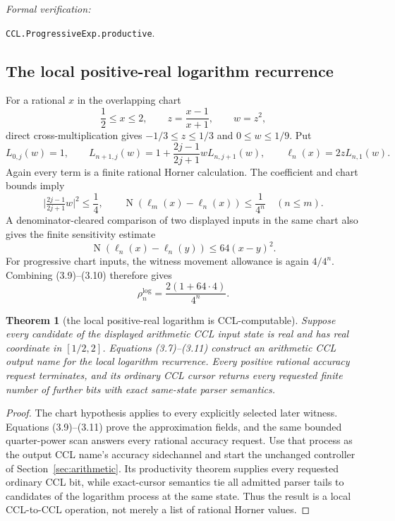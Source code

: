\documentclass[10pt]{article}
\newtheorem{theorem}{Theorem}[section]
\theoremstyle{definition}
\theoremstyle{remark}
\newcommand{\Norm}{\operatorname{N}}
\newcommand{\leanref}[1]{\par\smallskip\noindent
  \emph{Formal verification:}\par\nobreak
  {\raggedright\nolinkurl{#1}.\par}}
\begin{document}
\leanref{CCL.ProgressiveExp.productive}

\subsection{The local positive-real logarithm recurrence}

For a rational $x$ in the overlapping chart
\[
 \frac12\le x\le2,
 \qquad
 z=\frac{x-1}{x+1},
 \qquad w=z^2,
 \tag{3.7}
\]
direct cross-multiplication gives $-1/3\le z\le1/3$ and
$0\le w\le1/9$.  Put
\[
 L_{0,j}(w)=1,
 \qquad
 L_{n+1,j}(w)=1+\frac{2j-1}{2j+1}wL_{n,j+1}(w),
 \qquad
 \ell_n(x)=2zL_{n,1}(w).
 \tag{3.8}
\]
Again every term is a finite rational Horner calculation.  The coefficient
and chart bounds imply
\[
 \bigl|\tfrac{2j-1}{2j+1}w\bigr|^2\le\frac14,
 \qquad
 \Norm(\ell_m(x)-\ell_n(x))\le\frac1{4^n}
 \quad(n\le m).
 \tag{3.9}
\]
A denominator-cleared comparison of two displayed inputs in the same chart
also gives the finite sensitivity estimate
\[
 \Norm(\ell_n(x)-\ell_n(y))\le64(x-y)^2.
 \tag{3.10}
\]
For progressive chart inputs, the witness movement allowance is again
$4/4^n$.  Combining (3.9)--(3.10) therefore gives
\[
 \rho_n^{\log}=\frac{2(1+64\cdot4)}{4^n}.
 \tag{3.11}
\]

\begin{theorem}[the local positive-real logarithm is CCL-computable]
Suppose every candidate of the displayed arithmetic CCL input state is real
and has real coordinate in $[1/2,2]$.  Equations (3.7)--(3.11) construct an
arithmetic CCL output name for the local logarithm recurrence.  Every
positive rational accuracy request terminates, and its ordinary CCL cursor
returns every requested finite number of further bits with exact same-state
parser semantics.
\end{theorem}

\begin{proof}
The chart hypothesis applies to every explicitly selected later witness.
Equations (3.9)--(3.11) prove the approximation fields, and the same
bounded quarter-power scan answers every rational accuracy request.  Use
that process as the output CCL name's accuracy sidechannel and start the
unchanged controller of Section~\ref{sec:arithmetic}.  Its productivity
theorem supplies every
requested ordinary CCL bit, while exact-cursor semantics tie all admitted
parser tails to candidates of the logarithm process at the same state.  Thus
the result is a local CCL-to-CCL operation, not merely a list of rational
Horner values.
\end{proof}
\end{document}

